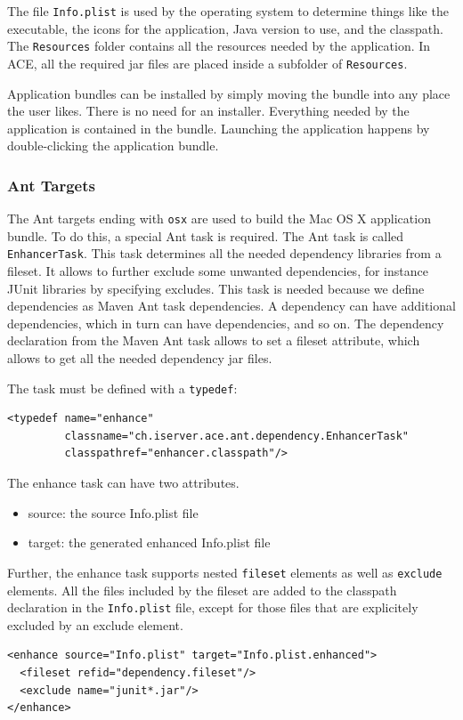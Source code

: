 \documentclass[11pt,a4paper]{article}
\begin{document}
The file \texttt{Info.plist} is used by the operating system to determine
things like the executable, the icons for the application, Java version to
use, and the classpath. The \texttt{Resources} folder contains all the
resources needed by the application. In ACE, all the required jar files
are placed inside a subfolder of \texttt{Resources}.

Application bundles can be installed by simply moving the bundle into any
place the user likes. There is no need for an installer. Everything needed
by the application is contained in the bundle. Launching the application
happens by double-clicking the application bundle.

\subsubsection{Ant Targets}
The Ant targets ending with \texttt{osx} are used to build the Mac OS X
application bundle. To do this, a special Ant task is required. The Ant
task is called \texttt{EnhancerTask}. This task determines all the needed
dependency libraries from a fileset. It allows to further exclude some
unwanted dependencies, for instance JUnit libraries by specifying excludes.
This task is needed because we define dependencies as Maven Ant task
dependencies. A dependency can have additional dependencies, which in turn
can have dependencies, and so on. The dependency declaration from 
the Maven Ant task allows to set a fileset attribute, which allows to
get all the needed dependency jar files.

The task must be defined with a \texttt{typedef}:

\small{
\begin{verbatim}
<typedef name="enhance"
         classname="ch.iserver.ace.ant.dependency.EnhancerTask"
         classpathref="enhancer.classpath"/>
\end{verbatim}
}

The enhance task can have two attributes.
\begin{itemize}
 \item source: the source Info.plist file
 \item target: the generated enhanced Info.plist file
\end{itemize}

Further, the enhance task supports nested \texttt{fileset} elements as well
as \texttt{exclude} elements. All the files included by the fileset are
added to the classpath declaration in the \texttt{Info.plist} file, except
for those files that are explicitely excluded by an exclude element.

\small{
\begin{verbatim}
<enhance source="Info.plist" target="Info.plist.enhanced">
  <fileset refid="dependency.fileset"/>
  <exclude name="junit*.jar"/>
</enhance>
\end{verbatim}
}
\end{document}
